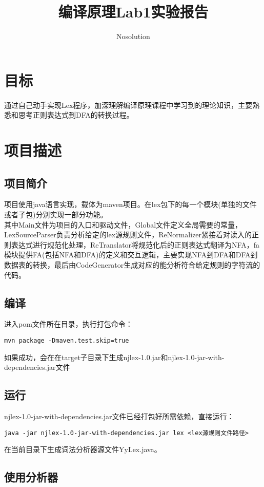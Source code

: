 \documentclass[a4paper]{ctexart} %
\title{编译原理Lab1实验报告}
\author{Nosolution}
\date{}
\begin{document}
	\maketitle
	
	\section{目标}
	通过自己动手实现Lex程序，加深理解编译原理课程中学习到的理论知识，主要熟悉和思考正则表达式到DFA的转换过程。

	\section{项目描述}

	\subsection{项目简介}
	项目使用java语言实现，载体为maven项目。在lex包下的每一个模块(单独的文件或者子包)分别实现一部分功能。\\
	其中Main文件为项目的入口和驱动文件，Global文件定义全局需要的常量，LexSourceParser负责分析给定的lex源规则文件，ReNormalizer紧接着对读入的正则表达式进行规范化处理，ReTranslator将规范化后的正则表达式翻译为NFA，fa模块提供FA(包括NFA和DFA)的定义和交互逻辑，主要实现NFA到DFA和DFA到数据表的转换，最后由CodeGenerator生成对应的能分析符合给定规则的字符流的代码。

	\subsection{编译}

	进入pom文件所在目录，执行打包命令：

	\verb|mvn package -Dmaven.test.skip=true|

	如果成功，会在在target子目录下生成njlex-1.0.jar和njlex-1.0-jar-with-dependencies.jar文件

	\subsection{运行}

	njlex-1.0-jar-with-dependencies.jar文件已经打包好所需依赖，直接运行：

	\verb|java -jar njlex-1.0-jar-with-dependencies.jar lex <lex源规则文件路径>|

	在当前目录下生成词法分析器源文件YyLex.java。

	\subsection{使用分析器}
\end{document}
